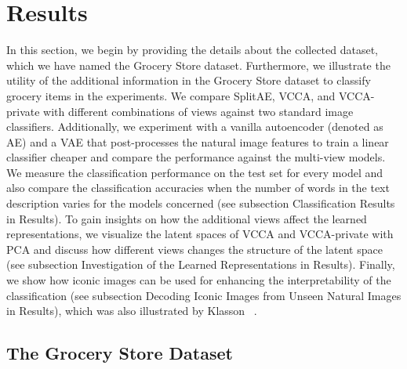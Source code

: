 \section{Results}\label{sec:results}

In this section, we begin by providing the details about the collected dataset, which we have named the Grocery Store dataset. Furthermore, we illustrate the utility of the additional information in the Grocery Store dataset to classify grocery items in the experiments. We compare SplitAE, VCCA, and VCCA-private with different combinations of views against two standard image classifiers. Additionally, we experiment with a vanilla autoencoder (denoted as AE) and a VAE that post-processes the natural image features to train a linear classifier cheaper and compare the performance against the multi-view models. We measure the classification performance on the test set for every model and also compare the classification accuracies when the number of words in the text description varies for the models concerned (see subsection Classification Results in Results).
To gain insights on how the additional views affect the learned representations, we visualize the latent spaces of VCCA and VCCA-private with PCA and discuss how different views changes the structure of the latent space (see subsection Investigation of the Learned Representations in Results).
Finally, we show how iconic images can be used for enhancing the interpretability of the classification (see subsection Decoding Iconic Images from Unseen Natural Images in Results),
which was also illustrated by Klasson \etal~\cite{klasson2019hierarchical}.


\subsection{The Grocery Store Dataset}
\label{sec:grocery_store_dataset}



